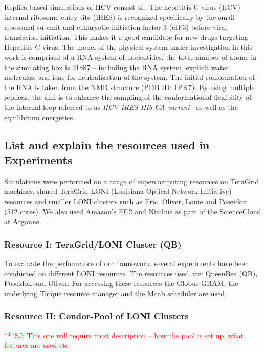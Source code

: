 \documentclass[conference,final]{IEEEtran}
\newcommand{\jhanote}[1]{ {\textcolor{red} { ***SJ: #1 }}}
\newcommand{\jhanote}[1]{}
\begin{document}
Replica-based simulations of HCV consist of..  The hepatitis C virus
(HCV) internal ribosome entry site (IRES) is recognized specifically
by the small ribosomal subunit and eukaryotic initiation factor 3
(eIF3) before viral translation initiation.  This makes it a good
candidate for new drugs targeting Hepatitis-C virus.  The model of the
physical system under investigation in this work is comprised of a RNA
system of nucleotides; the total number of atoms in the simulating box
is 21887 -- including the RNA system, explicit water molecules, and
ions for neutralization of the system.  The initial conformation of
the RNA is taken from the NMR structure (PDB ID: 1PK7).  By using
multiple replicas, the aim is to enhance the sampling of the
conformational flexibility of the internal loop referred to as {\it
  HCV IRES IIIb CA variant}~\cite{Collier:2002wd} as well as the
equilibrium energetics.

\subsection{List and explain the resources used in Experiments}

Simulations were performed on a range of supercomputing resources on
TeraGrid machines, shared TeraGrid-LONI (Louisiana Optical Network
Initiative)~\cite{LONI_web} resources and smaller LONI clusters such
as Eric, Oliver, Louie and Poseidon (512 cores).  We also used
Amazon's EC2 and Nimbus as part of the ScienceCloud at Argonne.

\subsubsection*{Resource I: TeraGrid/LONI Cluster (QB)}

To evaluate the performance of our framework, several experiments 
have been conducted on different LONI resources. The resources used are: 
QueenBee (QB), Poseidon and Oliver. For accessing these resources
the Globus GRAM, the underlying Torque resource manager and the Moab scheduler are used.

\subsubsection*{Resource II: Condor-Pool of LONI Clusters}

\jhanote{This one will require most description -- how the pool is set
up, what features are used etc}
\end{document}
